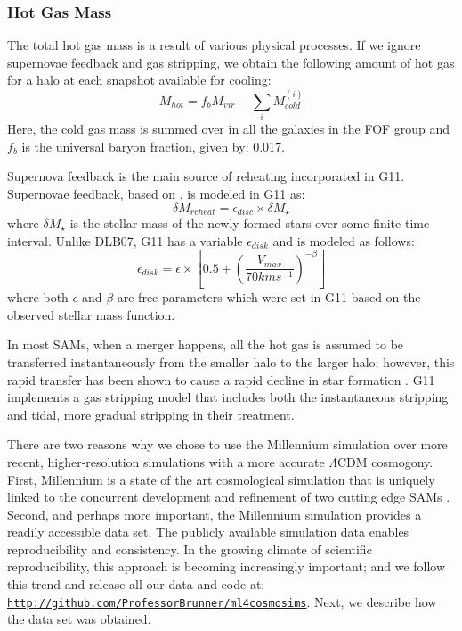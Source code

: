 \documentclass[a4paper,fleqn,usenatbib]{mnras}
\begin{document}
\subsubsection{Hot Gas Mass} \label{mdf: db_sam_hot}
The total hot gas mass is a result of various physical processes. If we ignore supernovae feedback and gas stripping, we obtain the following amount of hot gas for a halo at each snapshot available for cooling:
\begin{equation}
M_{hot} = f_b M_{vir} - \sum_i M_{cold}^{(i)}
\label{hot_analytic}
\end{equation}
Here, the cold gas mass is summed over in all the galaxies in the FOF group and $f_b$ is the universal baryon fraction, given by: 0.017. 
\par Supernova feedback is the main source of reheating incorporated in G11. Supernovae feedback, based on \citet{martin1999properties}, is modeled in G11 as:
\begin{equation}
\delta M_{reheat} = \epsilon_{disc} \times \delta M_{\star}
\label{bh1}
\end{equation}
where $\delta M_{\star}$ is the stellar mass of the newly formed stars over some finite time interval. Unlike DLB07, G11 has a variable $\epsilon_{disk}$ and is modeled as follows:
\begin{equation}
\epsilon_{disk} = \epsilon \times \left[0.5 + \left(\frac{V_{max}}{70 kms^{-1}}\right)^{-\beta}\right]
\label{bh2}
\end{equation}
where both $\epsilon$ and $\beta$ are free parameters which were set in G11 based on the observed stellar mass function. 
\par 
In most SAMs, when a merger happens, all the hot gas is assumed to be transferred instantaneously from the smaller halo to the larger halo; however, this rapid transfer has been shown to cause a rapid decline in star formation \citep{baldry2006galaxy, wang2007modelling}. G11 implements a gas stripping model that includes both the instantaneous stripping and tidal, more gradual stripping in their treatment. 

\par	There are two reasons why we chose to use the Millennium simulation over more recent, higher-resolution simulations with a more accurate $\Lambda$CDM cosmogony. First, Millennium is a state of the art cosmological simulation that is uniquely linked to the concurrent development and refinement of two cutting edge SAMs \citep{croton2006many, bower2006breaking}. Second, and perhaps more important, the Millennium simulation provides a readily accessible data set. The publicly available simulation data  enables reproducibility and consistency. In the growing climate of scientific reproducibility, this approach is becoming increasingly important; and we follow this trend and release all our data and code at: \href{http://github.com/ProfessorBrunner/ml4cosmosims}{\texttt{http://github.com/ProfessorBrunner/ml4cosmosims}}. Next, we describe how the data set was obtained.
\end{document}
